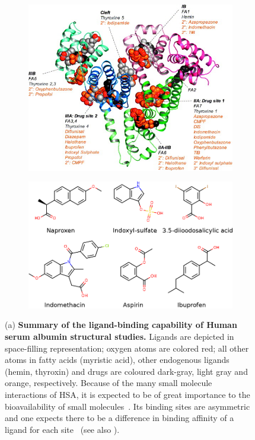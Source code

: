 \documentclass[10pt,final]{article}
\begin{document}
\begin{figure}[H]
\centering
\begin{subfigure}{.49\textwidth}
	\centering
	\includegraphics[width=0.9\linewidth]{figures/hsa_fig7_ghuman2005.jpg}
	\caption{
      }
	\label{figure:albumin}
	\end{subfigure}
	\hfill{}
 	\begin{subfigure}{.49\textwidth}
	  \centering	
	  \includegraphics[width=0.9\linewidth]{figures/hsa_compounds.png}
	  \caption{}
	  \label{figure:hsa-compounds}
 	\end{subfigure}
\caption{(a) \textbf{Summary of the ligand-binding capability of Human serum albumin structural studies.} Ligands are depicted in space-filling representation; oxygen atoms are colored red; all other atoms in fatty acids (myristic acid), other endogenous ligands (hemin, thyroxin) and drugs are coloured dark-gray, light gray and orange, respectively. Because of the many small molecule interactions of HSA, it is expected to be of great importance to the bioavailability of small molecules~\autocite{Metcalfe2010a}. Its binding sites are asymmetric~\autocite{He1992a, Curry1998a} and one expects there to be a difference in binding affinity of a ligand for each site~\autocite{Sudlow1976a} (see also ).
}
\end{figure}
\end{document}
